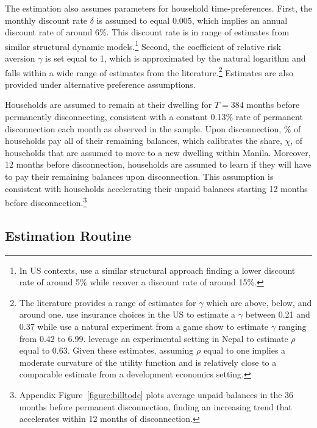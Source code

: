 \documentclass[12pt,table]{article}
\begin{document}
The estimation also assumes parameters for household time-preferences.  First, the monthly discount rate $\delta$ is assumed to equal 0.005, which implies an annual discount rate of around 6\%. This discount rate is in range of estimates from similar structural dynamic models.\footnote{In US contexts, \cite{gourinchas2002consumption} use a similar structural approach finding a lower discount rate of around 5\% while \cite{laibson2007estimating} recover a discount rate of around 15\%.}  Second, the coefficient of relative risk aversion $\gamma$ is set equal to 1, which is approximated by the natural logarithm and falls within a wide range of estimates from the literature.\footnote{The literature provides a range of estimates for $\gamma$ which are above, below, and around one.  \cite{barseghyan2013nature} use insurance choices in the US to estimate a $\gamma$ between 0.21 and 0.37 while  \cite{beetsma2001measuring} use a natural experiment from a game show to estimate $\gamma$ ranging from 0.42 to 6.99.  \cite{carvalho2016effect} leverage an experimental setting in Nepal to estimate $\rho$ equal to 0.63.  Given these estimates, assuming $\rho$ equal to one implies a moderate curvature of the utility function and is relatively close to a comparable estimate from a development economics setting.}  Estimates are also provided under alternative preference assumptions.

Households are assumed to remain at their dwelling for $T=384$ months before permanently disconnecting, consistent with a constant 0.13\% rate of permanent disconnection each month as observed in the sample.  Upon disconnection, \unskip\% of households pay all of their remaining balances, which calibrates the share, $\chi$, of households that are assumed to move to a new dwelling within Manila.  Moreover, 12 months before disconnection, households are assumed to learn if they will have to pay their remaining balances upon disconnection.  This assumption is consistent with households accelerating their unpaid balances starting 12 months before disconnection.\footnote{Appendix Figure~\ref{figure:billtodc} plots average unpaid balances in the 36 months before permanent disconnection, finding an increasing trend that accelerates within 12 months of disconnection.}

\subsection{Estimation Routine}\label{section:estimationroutine}
\end{document}
